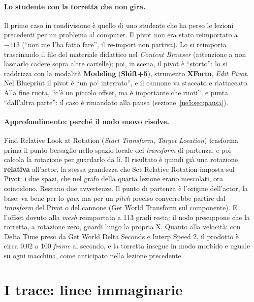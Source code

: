 \paragraph{Lo studente con la torretta che non gira.} Il primo caso in condivisione è
quello di uno studente che ha perso le lezioni precedenti per un problema al computer.
Il pivot non era stato reimportato a $-113$ (``non me l'ha fatto fare'', il re-import
non partiva). Lo si reimporta trascinando il file del materiale didattico nel
\emph{Content Browser} (attenzione a non lasciarlo cadere sopra altre cartelle); poi, in
scena, il pivot è ``storto'': lo si raddrizza con la modalità \textbf{Modeling}
(\textbf{Shift+5}), strumento \textbf{XForm}, \emph{Edit Pivot}. Nel Blueprint il pivot è
``un po' interrato'', e il cannone va staccato e riattaccato. Alla fine ruota, ``c'è un
piccolo offset, ma è importante che ruoti'', e punta ``dall'altra parte'': il caso è
rimandato alla pausa (sezione~\ref{ue5:sec:pausa}).

\paragraph{Approfondimento: perché il nodo nuovo risolve.} Find Relative Look at
Rotation (\emph{Start Transform}, \emph{Target Location}) trasforma prima il punto
bersaglio nello spazio locale del \emph{transform} di partenza, e poi calcola la
rotazione per guardarlo da lì. Il risultato è quindi già una rotazione
\textbf{relativa} all'actor, la stessa grandezza che Set Relative Rotation imposta sul
Pivot: i due spazi, che nel grafo della quarta lezione erano mescolati, ora coincidono.
Restano due avvertenze. Il punto di partenza è l'origine dell'actor, la base: va bene
per lo \emph{yaw}, ma per un \emph{pitch} preciso converrebbe partire dal
\emph{transform} del Pivot o del cannone (Get World Transform sul componente). E l'offset
dovuto alla \emph{mesh} reimportata a 113 gradi resta: il nodo presuppone che la
torretta, a rotazione zero, guardi lungo la propria X. Quanto alla velocità: con Delta
Time preso da Get World Delta Seconds e Interp Speed 2, il prodotto è circa 0,02 a 100
\emph{frame} al secondo, e la torretta insegue in modo morbido e uguale su ogni
macchina, come anticipato nella lezione precedente.

\section{I trace: linee immaginarie}
\label{ue5:sec:trace}

